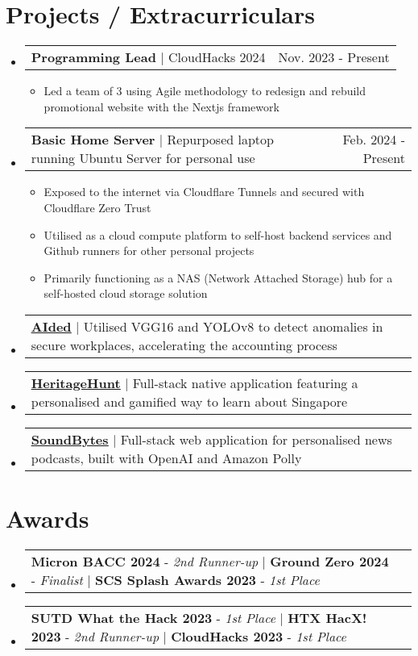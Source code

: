 \documentclass[letterpaper,11pt]{article}
\makeatletter
\newcommand{\resumeItem}[1]{
  \item\small{
    {#1 \vspace{-2pt}}
  }
}
\newcommand{\resumeProjectHeading}[2]{
    \item
    \begin{tabular*}{0.97\textwidth}{l@{\extracolsep{\fill}}r}
      \small#1 & #2 \\
    \end{tabular*}\vspace{-7pt}
}
\newcommand{\resumeSubHeadingListStart}{\begin{itemize}[leftmargin=0.15in, label={}]}
\newcommand{\resumeSubHeadingListEnd}{\end{itemize}}
\newcommand{\resumeItemListStart}{\begin{itemize}}
\newcommand{\resumeItemListEnd}{\end{itemize}\vspace{-5pt}}
\newcommand{\reduceSpace}[1]{
  \vspace{-#1}
}
\makeatother
\begin{document}
\section{Projects / Extracurriculars}
  \resumeSubHeadingListStart
    \resumeProjectHeading
      {\textbf{Programming Lead}  $|$ CloudHacks 2024}{Nov. 2023 - Present}
      \resumeItemListStart
        \resumeItem{Led a team of 3 using Agile methodology to redesign and rebuild promotional website with the Nextjs framework}
      \resumeItemListEnd
    \reduceSpace{4pt}
    \resumeProjectHeading
      {\textbf{Basic Home Server}  $|$ Repurposed laptop running Ubuntu Server for personal use}{Feb. 2024 - Present}
      \resumeItemListStart
        \resumeItem{Exposed to the internet via Cloudflare Tunnels and secured with Cloudflare Zero Trust}
        \resumeItem{Utilised as a cloud compute platform to self-host backend services and Github runners for other personal projects}
        \resumeItem{Primarily functioning as a NAS (Network Attached Storage) hub for a self-hosted cloud storage solution}
      \resumeItemListEnd
    \reduceSpace{4pt}
    \resumeProjectHeading
      {\textbf{\href{https://github.com/duckyfuz/accountingReID-hacX2023}{\underline{AIded}}} $|$ Utilised VGG16 and YOLOv8 to detect anomalies in secure workplaces, accelerating the accounting process}{}
    \resumeProjectHeading
      {\textbf{\href{https://github.com/duckyfuz/heritageHunt-SplashAwards2023}{\underline{HeritageHunt}}} $|$ Full-stack native application featuring a personalised and gamified way to learn about Singapore}{}
    \resumeProjectHeading
      {\textbf{\href{https://github.com/duckyfuz/soundBytes-cloudHacks2023}{\underline{SoundBytes}}} $|$ Full-stack web application for personalised news podcasts, built with OpenAI and Amazon Polly}{}
  \resumeSubHeadingListEnd


\section{Awards}
  \resumeSubHeadingListStart
    \resumeProjectHeading
    {\textbf{Micron BACC 2024} - \emph{2nd Runner-up} $|$ \textbf{Ground Zero 2024} - \emph{Finalist} $|$ \textbf{SCS Splash Awards 2023} - \emph{1st Place}}{}
    \resumeProjectHeading
        {\textbf{SUTD What the Hack 2023} - \emph{1st Place} $|$ \textbf{HTX HacX! 2023} - \emph{2nd Runner-up} $|$ \textbf{CloudHacks 2023} - \emph{1st Place}}{}
  \resumeSubHeadingListEnd


\end{document}
